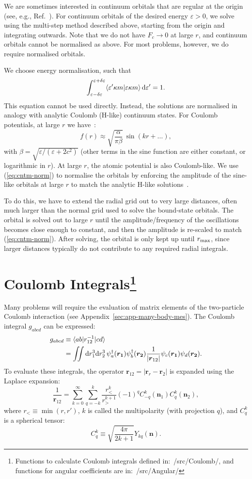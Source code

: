 \documentclass[10pt,twocolumn,a4paper]{article}%
\newcommand{\bra}[1]{\ensuremath{\langle #1|}}	%
\newcommand{\ket}[1]{\ensuremath{|#1\rangle}}
\newcommand{\braket}[1]{\ensuremath{\langle #1\rangle}}	%
\renewcommand{\v}[1]{\ensuremath{\boldsymbol{#1}}}		%
\newcommand{\be}{\begin{equation}}
\newcommand{\ee}{\end{equation}}
\def\d{\ensuremath{{\rm d}}}
\newcommand{\psidag}{\ensuremath{\psi^\dagger}}	%
\def\en{\ensuremath{\varepsilon}}
\renewcommand{\k}{\ensuremath{\kappa}}
\begin{document}
We are sometimes interested in continuum orbitals that are regular at the origin (see, e.g., Ref.~\cite{BetheBook}).
For continuum orbitals of the desired energy $\en>0$, we solve using the multi-step method described above, starting from the origin and integrating outwards.
Note that we do not have $F_c\to0$ at large $r$, and continuum orbitals cannot be normalised as above.
For most problems, however, we do require normalised orbitals.

We choose energy normalisation, such that
\be
\int_{\en-\delta\en}^{\en+\delta\en}\braket{\en' \k m|\en \k m}\,\d\en' = 1.
\ee
This equation cannot be used directly.
Instead, the solutions are normalised in analogy with analytic Coulomb (H-like) continuum states.
For Coulomb potentials, at large $r$ we have~\cite{BetheBook}:
\be\label{eq:cntm-norm}
f(r) \approx \sqrt{\frac{\alpha}{\pi \beta}}\,\sin(kr + \ldots),
\ee
with
$
\beta = \sqrt{{\en}/({\en + 2c^2})}
$
(other terms in the sine function are either constant, or logarithmic in $r$).
At large $r$, the atomic potential is also Coulomb-like.
We use (\ref{eq:cntm-norm}) to normalise the orbitals by enforcing the amplitude of the sine-like orbitals at large $r$ to match the analytic H-like solutions~\cite{BetheBook}.

To do this, we have to extend the radial grid out to very large distances, often much larger than the normal grid used to solve the bound-state orbitals.
The orbital is solved out to large $r$ until the amplitude/frequency of the oscillations becomes close enough to constant, and then the amplitude is re-scaled to match (\ref{eq:cntm-norm}).
After solving, the orbital is only kept up until $r_{\rm max}$, since larger distances typically do not contribute to any required radial integrals. 




\section[Coulomb Integrals]{Coulomb Integrals\label{sec:Coulomb}\footnote{Functions to calculate Coulomb integrals defined in:~/src/Coulomb/, and functions for angular coefficients are in:~/src/Angular/}}



Many problems will require the evaluation of matrix elements of the two-particle Coulomb interaction (see Appendix~\ref{sec:app-many-body-mes}).
The Coulomb integral $g_{abcd}$ can be expressed:
\begin{align}\label{eq:gabcd}
g_{abcd} 
&\equiv \bra{ab}r_{12}^{-1}\ket{cd}\notag\\
&=
\iint\d r_1^3\d r_2^3 \, \psidag_a(\v{r_1})\psidag_b(\v{r_2})\frac{1}{|\v{r}_{12}|}\psi_c(\v{r_1})\psi_d(\v{r_2}) .
\end{align}
To evaluate these integrals, the operator $\v{r}_{12}=|\v{r}_r-\v{r}_2|$ is expanded using the Laplace expansion:
\be
\frac{1}{\v{r}_{12}} = \sum_{k=0}^\infty \sum_{q=-k}^k\frac{r_<^k}{r_>^{k+1}}(-1)^q C^k_{-q}(\v{n}_1)C^k_{q}(\v{n}_2),
\ee
where $r_{<} \equiv \min(r,r')$, 
$k$ is called the multipolarity (with projection $q$),
and $C^k_{q}$ is a spherical tensor:
\be
C^k_{q} \equiv \sqrt{\frac{4\pi}{2k+1}}Y_{kq}(\v{n}).
\ee
\end{document}
